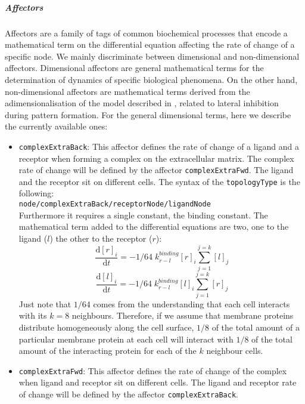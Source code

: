 \documentclass[a4paper, 11pt]{article}
\begin{document}
\subparagraph{Affectors} \label{affectors}
Affectors are a family of tags of common biochemical processes that encode a mathematical term on the differential equation affecting the rate of change of a specific node.
We mainly discriminate between dimensional and non-dimensional affectors. 
Dimensional affectors are general mathematical terms for the determination of dynamics of specific biological phenomena.
On the other hand, non-dimensional affectors are mathematical terms derived from the adimensionalisation of the model described in \cite{garciadelomana08}, related to lateral inhibition during pattern formation. 
For the general dimensional terms, here we describe the currently available ones:
\begin{itemize}
\item \texttt{complexExtraBack}: 
  This affector defines the rate of change of a ligand and a receptor when forming a complex on the extracellular matrix.
  The complex rate of change will be defined by the affector \texttt{complexExtraFwd}.
  The ligand and the receptor sit on different cells.
  The syntax of the \texttt{topologyType} is the following:\\[1.5ex]
  \texttt{node/complexExtraBack/receptorNode/ligandNode}\\[1.5ex]
  Furthermore it requires a single constant, the binding constant.
  The mathematical term added to the differential equations are two, one to the ligand ($l$) the other to the receptor ($r$):
  \begin{equation}
    \frac{\mathrm{d}[r]_i}{\mathrm{d}t} = - 1/64\;k^{binding}_{r-l}[r]_i \sum_{j = 1}^{j = k} [l]_j
  \end{equation}
  \begin{equation}
    \frac{\mathrm{d}[l]_i}{\mathrm{d}t} = - 1/64\; k^{binding}_{r-l}[l]_i \sum_{j = 1}^{j = k} [r]_j
  \end{equation}
  Just note that $1/64$ comes from the understanding that each cell interacts with its $k=8$ neighbours.
  Therefore, if we assume that membrane proteins distribute homogeneously along the cell surface, $1/8$ of the total amount of a particular membrane protein at each cell will interact with $1/8$ of the total amount of the interacting protein for each of the $k$ neighbour cells.
\item \texttt{complexExtraFwd}: 
  This affector defines the rate of change of the complex when ligand and receptor sit on different cells.
  The ligand and receptor rate of change will be defined by the affector \texttt{complexExtraBack}.

\end{itemize}
\end{document}
